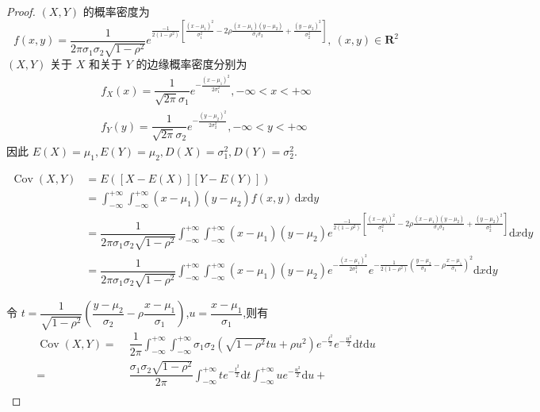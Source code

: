 \begin{proof}
    $(X,Y)$ 的概率密度为
    $$
    f(x,y) = \dfrac{1}{2 \pi \sigma_1 \sigma_2 \sqrt{1-\rho^2}} e^{\frac{-1}{2(1-\rho^2)} \left[ \frac{(x-\mu_1)^2}{\sigma_1^2} - 2 \rho \frac{(x-\mu_1)(y-\mu_2)}{\sigma_1 \sigma_2} + \frac{(y-\mu_2)^2}{\sigma_2^2} \right]},\ (x,y)\in \mathbf{R}^2
    $$
    $(X,Y)$ 关于 $X$ 和关于 $Y$ 的边缘概率密度分别为
    \begin{gather*}
        f_{X}(x) = \dfrac{1}{\sqrt{2\pi} \sigma_1} e^{-\frac{(x-\mu_1)^2}{2 \sigma_1^2}}, -\infty < x < +\infty \\
        f_{Y}(y) = \dfrac{1}{\sqrt{2\pi} \sigma_2} e^{-\frac{(y-\mu_2)^2}{2 \sigma_2^2}}, -\infty < y < +\infty
    \end{gather*}
    因此 $E(X) = \mu_1, E(Y) = \mu_2, D(X) = \sigma_1^2, D(Y) = \sigma_2^2$.
    \begin{small}
    $$
    \begin{aligned}
        \operatorname{Cov}(X,Y) &= E([X-E(X)][Y-E(Y)]) \\
        &= \int_{-\infty}^{+\infty} \int_{-\infty}^{+\infty} (x-\mu_1)(y-\mu_2) f(x,y) \, \text{d}x \text{d}y \\
        &= \dfrac{1}{2 \pi \sigma_1 \sigma_2 \sqrt{1-\rho^2}} \int_{-\infty}^{+\infty} \int_{-\infty}^{+\infty} (x-\mu_1)(y-\mu_2) e^{\frac{-1}{2(1-\rho^2)} \left[ \frac{(x-\mu_1)^2}{\sigma_1^2} - 2 \rho \frac{(x-\mu_1)(y-\mu_2)}{\sigma_1 \sigma_2} + \frac{(y-\mu_2)^2}{\sigma_2^2} \right]} \text{d}x \text{d}y \\
        &= \dfrac{1}{2 \pi \sigma_1 \sigma_2 \sqrt{1-\rho^2}} \int_{-\infty}^{+\infty} \int_{-\infty}^{+\infty} (x-\mu_1)(y-\mu_2) e^{-\frac{(x-\mu_1)^2}{2 \sigma_1^2}} e^{-\frac{1}{2(1-\rho^2)} \left( \frac{y-\mu_2}{\sigma_2} - \rho \frac{x-\mu_1}{\sigma_1} \right)^2} \text{d}x \text{d}y
    \end{aligned}
    $$
    \end{small}
    令 $t = \dfrac{1}{\sqrt{1-\rho^2}} \left( \dfrac{y-\mu_2}{\sigma_2} - \rho \dfrac{x-\mu_1}{\sigma_1} \right)$,$u = \dfrac{x-\mu_1}{\sigma_1}$,则有
    $$
    \begin{aligned}
        \operatorname{Cov}(X,Y) = & \; \dfrac{1}{2 \pi} \int_{-\infty}^{+\infty} \int_{-\infty}^{+\infty} \sigma_1 \sigma_2 (\sqrt{1-\rho^2} tu + \rho u^2) e^{-\frac{t^2}{2}} e^{-\frac{u^2}{2}} \text{d}t \text{d}u \\
        = & \; \dfrac{\sigma_1 \sigma_2 \sqrt{1-\rho^2}}{2 \pi} \int_{-\infty}^{+\infty} t e^{-\frac{t^2}{2}} \text{d}t \int_{-\infty}^{+\infty} u e^{-\frac{u^2}{2}} \text{d}u + \\

\end{aligned}$$
\end{proof}

